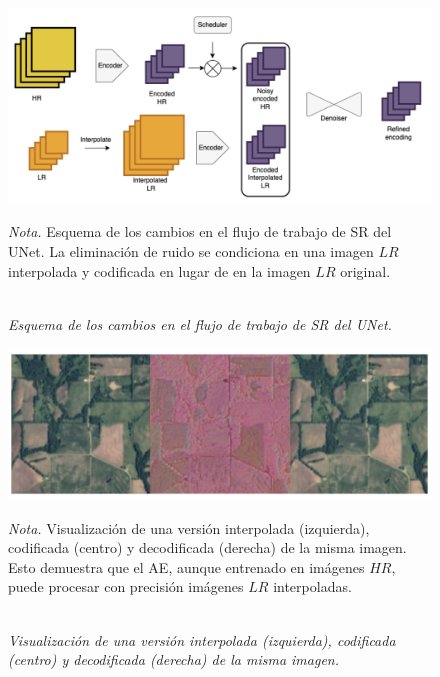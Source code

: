 \begin{figure}[H]
    \caption{\doublespacing \\ \textit{Esquema de los cambios en el flujo de trabajo de SR del UNet.}} 
    \centering
    \includegraphics[width=1\linewidth]{images/simon/encLR_schema.png}
    \begin{justify}
        \textit{Nota.} Esquema de los cambios en el flujo de trabajo de SR del UNet. La eliminación de ruido se condiciona en una imagen $LR$ interpolada y codificada en lugar de en la imagen $LR$ original.
    \end{justify}                    
    \label{fig:encLR_schema}
\end{figure}

\begin{figure}[H]
    \caption{\doublespacing \\ \textit{Visualización de una versión interpolada (izquierda), codificada (centro) y decodificada (derecha) de la misma imagen.}} 
    \centering
    \includegraphics[width=1\linewidth]{images/simon/encLRint_demo.png}
    \begin{justify}
        \textit{Nota.} Visualización de una versión interpolada (izquierda), codificada (centro) y decodificada (derecha) de la misma imagen. Esto demuestra que el AE, aunque entrenado en imágenes $HR$, puede procesar con precisión imágenes $LR$ interpoladas.
    \end{justify}                    
    \label{fig:encLRint_demo}
\end{figure}

